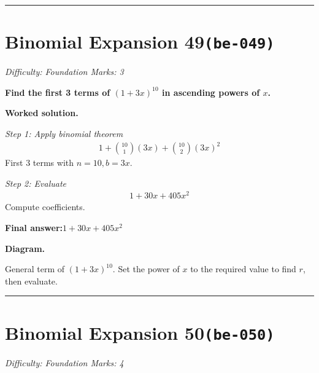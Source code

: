 \documentclass[11pt]{article}
\newcommand{\question}[1]{\par\medskip\noindent\textbf{#1}\par}
\begin{document}
\medskip\hrule

\section*{Binomial Expansion 49\quad\small\texttt{(be-049)}}
\textit{Difficulty: Foundation \quad\textbar\quad Marks: 3}

\question{Find the first 3 terms of \( (1 + 3x)^{10} \) in ascending powers of \( x \).}

\textbf{Worked solution.}

\textit{Step 1: Apply binomial theorem}
\[\begin{gathered}
1 + \binom{10}{1}(3x) + \binom{10}{2}(3x)^2
\end{gathered}\]
First 3 terms with \( n=10, b=3x \).

\textit{Step 2: Evaluate}
\[\begin{gathered}
1 + 30x + 405x^2
\end{gathered}\]
Compute coefficients.

\begin{answerbox}
\textbf{Final answer:}\quad \(\displaystyle 1 + 30x + 405x^2\)
\end{answerbox}
\textbf{Diagram.}

\begin{center}
\end{center}
\small General term of $\left(1+3x\right)^{10}$. Set the power of $x$ to the required value to find $r$, then evaluate.\normalsize

\medskip\hrule

\section*{Binomial Expansion 50\quad\small\texttt{(be-050)}}
\textit{Difficulty: Foundation \quad\textbar\quad Marks: 4}
\end{document}

